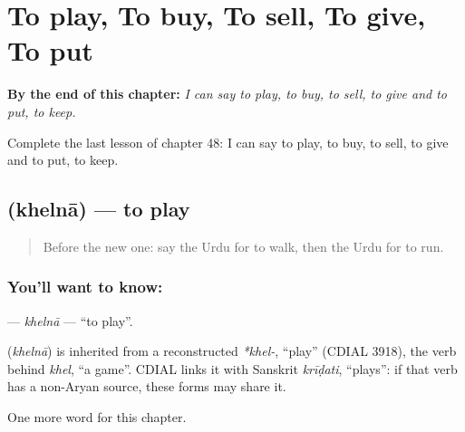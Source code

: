 
\chapter{To play, To buy, To sell, To give, To put}
\label{ch:ur-to-play-to-buy-to-sell-to-give-to-put}

\begin{chapteropening}
\textbf{By the end of this chapter:} \emph{I can say to play, to buy, to sell, to give and to put, to keep.}

Complete the last lesson of chapter 48: I can say to play, to buy, to sell, to give and to put, to keep.
\end{chapteropening}

\section[\texorpdfstring{\ur{کھیلنا} (khelnā)}{کھیلنا (khelnā)}]{ (khelnā) — to play}

\label{lesson:UR-C48-khelna}



\begin{quote}
Before the new one: say the Urdu for to walk, then the Urdu for to run.
\end{quote}

\subsection*{You'll want to know: }
\textbf{} — \emph{khelnā} — \textquotedblleft{}to play\textquotedblright{}.

\begin{cousinweb}
\textbf{} (\emph{khelnā}) is inherited from a reconstructed \emph{*khel-}, \textquotedblleft{}play\textquotedblright{} (CDIAL 3918), the verb behind \emph{khel}, \textquotedblleft{}a game\textquotedblright{}. CDIAL links it with Sanskrit \emph{krīḍati}, \textquotedblleft{}plays\textquotedblright{}: if that verb has a non-Aryan source, these forms may share it.
\end{cousinweb}

\begin{grammarlens}[title={What you've built}]
One more word for this chapter.
\end{grammarlens}

